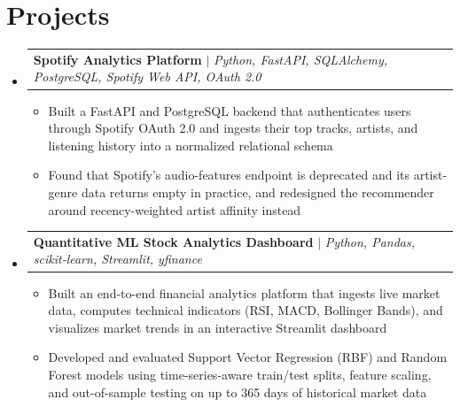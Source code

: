 \documentclass[letterpaper,11pt]{article}
\makeatletter
\newcommand{\resumeItem}[1]{\item\small{{#1 \vspace{-2pt}}}}
\newcommand{\resumeProjectHeading}[2]{
    \item
    \begin{tabular*}{0.97\textwidth}{l@{\extracolsep{\fill}}r}
      \small#1 & #2 \\
    \end{tabular*}\vspace{-7pt}
}
\newcommand{\resumeSubHeadingListStart}{\begin{itemize}[leftmargin=0.15in, label={}]}
\newcommand{\resumeSubHeadingListEnd}{\end{itemize}}
\newcommand{\resumeItemListStart}{\begin{itemize}}
\newcommand{\resumeItemListEnd}{\end{itemize}\vspace{-5pt}}
\makeatother
\begin{document}
\section{Projects}
    \resumeSubHeadingListStart
      \resumeProjectHeading
          {\textbf{Spotify Analytics Platform} $|$ \emph{Python, FastAPI, SQLAlchemy, PostgreSQL, Spotify Web API, OAuth 2.0}}{}
          \resumeItemListStart
            \resumeItem{Built a FastAPI and PostgreSQL backend that authenticates users through Spotify OAuth 2.0 and ingests their top tracks, artists, and listening history into a normalized relational schema}
            \resumeItem{Found that Spotify's audio-features endpoint is deprecated and its artist-genre data returns empty in practice, and redesigned the recommender around recency-weighted artist affinity instead}
          \resumeItemListEnd
      \resumeProjectHeading
          {\textbf{Quantitative ML Stock Analytics Dashboard} $|$ \emph{Python, Pandas, scikit-learn, Streamlit, yfinance}}{}
          \resumeItemListStart
            \resumeItem{Built an end-to-end financial analytics platform that ingests live market data, computes technical indicators (RSI, MACD, Bollinger Bands), and visualizes market trends in an interactive Streamlit dashboard}
            \resumeItem{Developed and evaluated Support Vector Regression (RBF) and Random Forest models using time-series-aware train/test splits, feature scaling, and out-of-sample testing on up to 365 days of historical market data}
          \resumeItemListEnd
    \resumeSubHeadingListEnd
\end{document}

